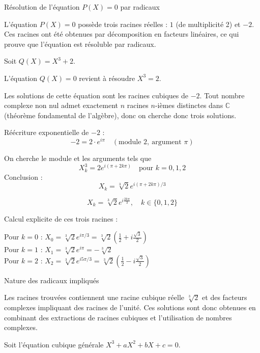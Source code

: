 \documentclass[10pt,a4paper]{article}
\begin{document}
Résolution de l'équation \( P(X) = 0 \) par radicaux

L'équation \( P(X) = 0 \) possède trois racines réelles : \( 1 \) (de multiplicité 2) et \( -2 \).
Ces racines ont été obtenues par décomposition en facteurs linéaires, ce qui prouve que l'équation
est résoluble par radicaux.


\q Soit \( Q(X) = X^3 + 2 \).

L'équation \( Q(X) = 0 \) revient à résoudre $X^3 = 2$.

Les solutions de cette équation sont les racines cubiques de \( -2 \). Tout nombre complexe non nul
admet exactement $n$ racines $n$-ièmes distinctes dans $\mathbb{C}$ (théorème fondamental de
l'algèbre), donc on cherche donc trois solutions.

Réécriture exponentielle de $-2$ :
$$
-2 = 2 \cdot e^{i\pi} \quad (\text{module } 2,\ \text{argument } \pi)
$$

On cherche le module et les arguments tels que
$$X_k^3 = 2e^{i(\pi + 2k\pi)} \quad \text{pour } k = 0, 1, 2$$
Conclusion :
$$X_k = \sqrt[3]{2} e^{i(\pi + 2k\pi)/3}$$

\[
X_k = \sqrt[3]{2} e^{i \frac{2k\pi}{3}}, \quad k \in \{0,1,2\}
\]

Calcul explicite de ces trois racines :

Pour \( k = 0 \) : \( X_0 = \sqrt[3]{2} e^{i\pi/3} = \sqrt[3]{2} \left(\frac{1}{2} +
i\frac{\sqrt{3}}{2}\right) \)\\
Pour \( k = 1 \) : \( X_1 = \sqrt[3]{2} e^{i\pi} = -\sqrt[3]{2} \)\\
Pour \( k = 2 \) : \( X_2 = \sqrt[3]{2} e^{i5\pi/3} = \sqrt[3]{2} \left(\frac{1}{2} - i\frac{\sqrt{3}}{2}\right) \)

Nature des radicaux impliqués

Les racines trouvées contiennent une racine cubique réelle \( \sqrt[3]{2} \) et des facteurs
complexes impliquant des racines de l'unité. Ces solutions sont donc obtenues en combinant des
extractions de racines cubiques et l'utilisation de nombres complexes.


\q Soit l'équation cubique générale \( X^3 + aX^2 + bX + c = 0 \).
\end{document}
